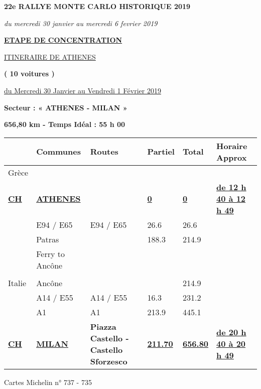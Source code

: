 \documentclass{article}%
\begin{document}
%
\normalsize%
\begin{center} \textbf{\LARGE{22e RALLYE MONTE CARLO HISTORIQUE 2019}} \end{center}%
\begin{center} \textit{du mercredi 30 janvier au mercredi 6 fevrier 2019} \end{center}%
\begin{center} \textbf{\underline{ETAPE DE CONCENTRATION}} \end{center}%
\begin{center} \underline{ITINERAIRE DE ATHENES					
} \end{center}%
\begin{center} \textbf{( 10 voitures )} \end{center}%
\begin{flushright} \underline{du  Mercredi 30 Janvier au Vendredi  1 Février 2019} \end{flushright}%
\begin{flushleft} \textbf{Secteur : « ATHENES - MILAN  »
} \end{flushleft}%
\begin{flushright} \textbf{656,80 km - Temps Idéal :   55 h 00 
} \end{flushright}%
\begin{longtable}{p{2.25cm}|p{5.0cm}|p{3.5cm}|p{1.5cm}|p{1.5cm}|p{3.5cm}}%
\hline%
&Communes&Routes&Partiel&Total&Horaire Approx\\%
\hline%
\endhead%
\endfoot%
\endlastfoot%
﻿Grèce& & & & & \\%
\textbf{\underline{CH}}&\textbf{\underline{ATHENES}}& &\textbf{\underline{0}}&\textbf{\underline{0}}&\textbf{\underline{de 12 h 40 à 12 h 49}}\\%
 &E94 / E65&E94 / E65&26.6&26.6& \\%
 &Patras& &188.3&214.9& \\%
 &Ferry to Ancône& & & & \\%
\hline& & & & & \\%
Italie&Ancône& & &214.9& \\%
 &A14 / E55&A14 / E55&16.3&231.2& \\%
 &A1&A1&213.9&445.1& \\%
\textbf{\underline{CH}}&\textbf{\underline{MILAN}}&\textbf{Piazza Castello - Castello Sforzesco}&\textbf{\underline{211.70}}&\textbf{\underline{656.80}}&\textbf{\underline{de 20 h 40 à 20 h 49}}\\%
\hline%
\end{longtable}%
\begin{flushleft} Cartes Michelin n° 737 - 735 \end{flushleft}%
\end{document}
